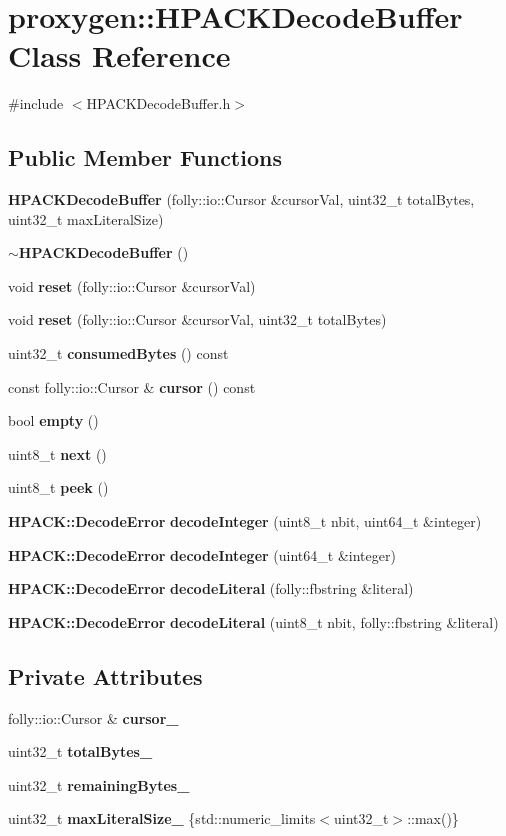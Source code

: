 \section{proxygen\+:\+:H\+P\+A\+C\+K\+Decode\+Buffer Class Reference}
\label{classproxygen_1_1HPACKDecodeBuffer}


{\ttfamily \#include $<$H\+P\+A\+C\+K\+Decode\+Buffer.\+h$>$}

\subsection*{Public Member Functions}
\begin{DoxyCompactItemize}
\item 
{\bf H\+P\+A\+C\+K\+Decode\+Buffer} (folly\+::io\+::\+Cursor \&cursor\+Val, uint32\+\_\+t total\+Bytes, uint32\+\_\+t max\+Literal\+Size)
\item 
{\bf $\sim$\+H\+P\+A\+C\+K\+Decode\+Buffer} ()
\item 
void {\bf reset} (folly\+::io\+::\+Cursor \&cursor\+Val)
\item 
void {\bf reset} (folly\+::io\+::\+Cursor \&cursor\+Val, uint32\+\_\+t total\+Bytes)
\item 
uint32\+\_\+t {\bf consumed\+Bytes} () const 
\item 
const folly\+::io\+::\+Cursor \& {\bf cursor} () const 
\item 
bool {\bf empty} ()
\item 
uint8\+\_\+t {\bf next} ()
\item 
uint8\+\_\+t {\bf peek} ()
\item 
{\bf H\+P\+A\+C\+K\+::\+Decode\+Error} {\bf decode\+Integer} (uint8\+\_\+t nbit, uint64\+\_\+t \&integer)
\item 
{\bf H\+P\+A\+C\+K\+::\+Decode\+Error} {\bf decode\+Integer} (uint64\+\_\+t \&integer)
\item 
{\bf H\+P\+A\+C\+K\+::\+Decode\+Error} {\bf decode\+Literal} (folly\+::fbstring \&literal)
\item 
{\bf H\+P\+A\+C\+K\+::\+Decode\+Error} {\bf decode\+Literal} (uint8\+\_\+t nbit, folly\+::fbstring \&literal)
\end{DoxyCompactItemize}
\subsection*{Private Attributes}
\begin{DoxyCompactItemize}
\item 
folly\+::io\+::\+Cursor \& {\bf cursor\+\_\+}
\item 
uint32\+\_\+t {\bf total\+Bytes\+\_\+}
\item 
uint32\+\_\+t {\bf remaining\+Bytes\+\_\+}
\item 
uint32\+\_\+t {\bf max\+Literal\+Size\+\_\+} \{std\+::numeric\+\_\+limits$<$uint32\+\_\+t$>$\+::max()\}
\end{DoxyCompactItemize}


